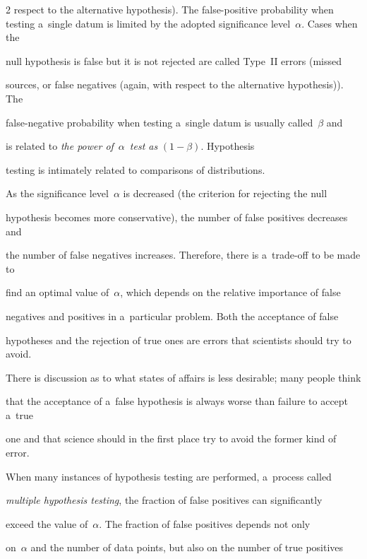 \begin{multicols}{2}
respect to the alternative hypothesis). The false-positive probability when testing a~single datum is limited by the adopted significance level~$\alpha$. Cases when the


null hypothesis is false but it is not rejected are called Type~II errors (missed


sources, or false negatives (again, with respect to the alternative hypothesis)). The


false-negative probability when testing a~single datum is usually called~$\beta$ and


is related to \textit{the power of}~$\alpha$~\textit{test as} $(1 -\beta)$. Hypothesis


testing is intimately related to comparisons of distributions.





  As the significance level~$\alpha$ is decreased (the criterion for rejecting the null


hypothesis becomes more conservative), the number of false positives decreases and


the number of false negatives increases. Therefore, there is a~trade-off to be made to


find an optimal value of~$\alpha$, which depends on the relative importance of false


negatives and positives in a~particular problem. Both the acceptance of false


hypotheses and the rejection of true ones are errors that scientists should try to avoid.


There is discussion as to what states of affairs is less desirable; many people think


that the acceptance of a~false hypothesis is always worse than failure to accept a~true


one and that science should in the first place try to avoid the former kind of error.





  When many instances of hypothesis testing are performed, a~process called


\textit{multiple hypothesis testing}, the fraction of false positives can significantly


exceed the value of~$\alpha$. The fraction of false positives depends not only


on~$\alpha$ and the number of data points, but also on the number of true positives



\end{multicols}
